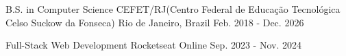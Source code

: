 

\begin{cventries}

  \cventry
    {B.S. in Computer Science} %
    {CEFET/RJ(Centro Federal de Educação Tecnológica Celso Suckow da Fonseca)} %
    {Rio de Janeiro, Brazil} %
    {Feb. 2018 - Dec. 2026} %
    {}

  \cventry
    {Full-Stack Web Development} %
    {Rocketseat} %
    {Online} %
    {Sep. 2023 - Nov. 2024} %
    {}

\end{cventries}
